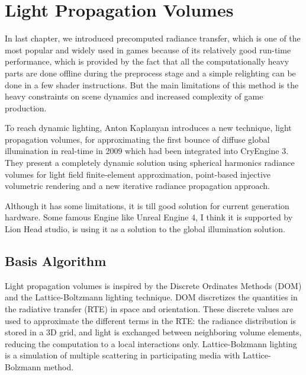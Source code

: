 \chapter{Light Propagation Volumes}\label{chp:lpv}
In last chapter, we introduced precomputed radiance transfer, which is one of the most popular and widely used in games because of its relatively good run-time performance, which is provided by the fact that all the computationally heavy parts are done offline during the preprocess stage and a simple relighting can be done in a few shader instructions. But the main limitations of this method is the heavy constraints on scene dynamics and increased complexity of game production.

To reach dynamic lighting, Anton Kaplanyan\cite[-7mm]{a:LightPropagationVolumesinCryEngine3} introduces a new technique, light propagation volumes, for approximating the first bounce of diffuse global illumination in real-time in 2009 which had been integrated into CryEngine 3. They present a completely dynamic solution using spherical harmonics radiance volumes for light field finite-element approximation, point-based injective volumetric rendering and a new iterative radiance propagation approach.

Although it has some limitations, it is till good solution for current generation hardware. Some famous Engine like Unreal Engine 4, I think it is supported by Lion Head studio, is using it as a solution to the global illumination solution.



\section{Basis Algorithm}
Light propagation volumes is inspired by the Discrete Ordinates Methods (DOM)\cite[-5mm]{a:RadiativeTransfer} and the Lattice-Boltzmann lighting\cite[5mm]{a:Lattice-BoltzmannLighting} technique. DOM discretizes the quantities in the radiative transfer (RTE) in space and orientation. These discrete values are used to approximate the different terms in the RTE: the radiance distribution is stored in a 3D grid, and light is exchanged between neighboring volume elements, reducing the computation to a local interactions only. Lattice-Bolzmann lighting is a simulation of multiple scattering in participating media with Lattice-Bolzmann method.

